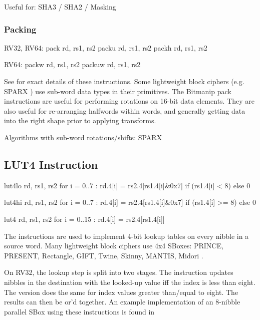 Useful for: SHA3 / SHA2 / Masking

\subsubsection{Packing}

\begin{cryptobitmanipisa}
RV32, RV64: 
    pack   rd, rs1, rs2
    packu  rd, rs1, rs2
    packh  rd, rs1, rs2

RV64: 
    packw  rd, rs1, rs2
    packuw rd, rs1, rs2
\end{cryptobitmanipisa}

See \cite[Section 2.1.4]{riscv:bitmanip:draft} for exact details of
these instructions.
Some lightweight block ciphers
(e.g. SPARX \cite{DPUVGB:16})
use sub-word data types in their primitives.
The Bitmanip pack instructions are useful for performing rotations on
16-bit data elements.
They are also useful for re-arranging halfwords within words, and
generally getting data into the right shape prior to applying transforms.

Algorithms with sub-word rotations/shifts:
SPARX


\subsection{LUT4 Instruction}

\begin{cryptoisa}
lut4lo  rd, rs1, rs2
    for i = 0..7 : rd.4[i] = rs2.4[rs1.4[i]&0x7] if (rs1.4[i] <  8) else 0

lut4hi  rd, rs1, rs2
    for i = 0..7 : rd.4[i] = rs2.4[rs1.4[i]&0x7] if (rs1.4[i] >= 8) else 0

lut4    rd, rs1, rs2
    for i = 0..15 : rd.4[i] = rs2.4[rs1.4[i]]
\end{cryptoisa}

The  instructions are used to implement 4-bit lookup tables
on every nibble in a source word.
Many lightweight block ciphers use 4x4 SBoxes:
PRINCE\cite{block:prince},
PRESENT\cite{block:present},
Rectangle\cite{block:rectangle},
GIFT\cite{block:gift},
Twine\cite{block:twine},
Skinny, MANTIS\cite{block:skinny},
Midori \cite{block:midori}.

On RV32, the lookup step is split into two stages.
The  instruction
updates nibbles in the destination with the looked-up value
iff the index is less than eight.
The  version does
the same for index values greater than/equal to eight.
The results can then be or'd together.
An example implementation of an $8$-nibble parallel SBox using these
instructions is found in 

